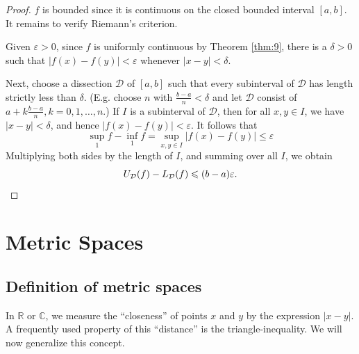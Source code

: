 \documentclass[a4paper]{article}
\begin{document}
\begin{proof}
    $f$ is bounded since it is continuous on the closed bounded interval $[a, b]$. It remains to verify Riemann's criterion.

    Given $\varepsilon>0$, since $f$ is uniformly continuous by Theorem \ref{thm:9}, there is a $\delta>0$ such that $|f(x)-f(y)|<\varepsilon$ whenever $|x-y|<\delta$.
    
    Next, choose a dissection $\mathcal{D}$ of $[a, b]$ such that every subinterval of $\mathcal{D}$ has length strictly less than $\delta$. (E.g. choose $n$ with $\frac{b-a}{n}<\delta$ and let $\mathcal{D}$ consist of $a+k \frac{b-a}{n}, k=0,1, \ldots, n$.) If $I$ is a subinterval of $\mathcal{D}$, then for all $x, y \in I$, we have $|x-y|<\delta$, and hence $|f(x)-f(y)|<\varepsilon$. It follows that
    \[
    \sup _{1} f-\inf _{1} f=\underset{x, y \in I}{\sup }|f(x)-f(y)| \leqslant \varepsilon
    \]
    Multiplying both sides by the length of $I$, and summing over all $I$, we obtain
    \[
    U_{\mathcal{D}}(f)-L_{\mathcal{D}}(f) \leqslant(b-a) \varepsilon.\qedhere
    \]
\end{proof}

\section{Metric Spaces}
\subsection{Definition of metric spaces}
In $\mathbb{R}$ or $\mathbb{C}$, we measure the ``closeness'' of points $x$ and $y$ by the expression $|x-y|$. A frequently used property of this ``distance'' is the triangle-inequality. We will now generalize this concept.
\end{document}
